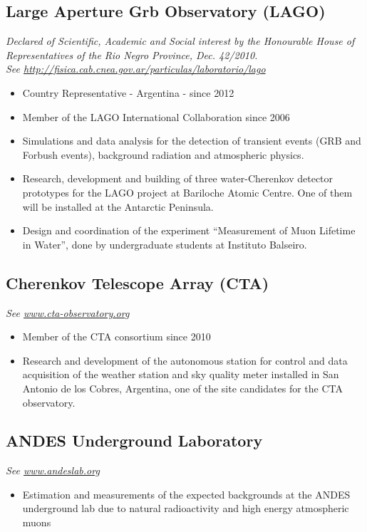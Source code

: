 \subsection*{Large Aperture Grb Observatory (LAGO)}
{\emph{Declared of Scientific, Academic and Social interest by the Honourable
House of Representatives of the Rio Negro Province, Dec. 42/2010.}}\\
{\small{\textit{See
\href{http://fisica.cab.cnea.gov.ar/particulas/laboratorio/lago}
{http://fisica.cab.cnea.gov.ar/particulas/laboratorio/lago}}}}\\
\begin{itemize}
\item Country Representative - Argentina - since 2012
\item Member of the LAGO International Collaboration since 2006
\item Simulations and data analysis for the detection of transient events
(GRB and Forbush events), background radiation and atmospheric physics.
\item Research, development and building of three water-Cherenkov detector
prototypes for the LAGO project at Bariloche Atomic Centre. One of them will be
installed at the Antarctic Peninsula.
\item Design and coordination of the experiment ``Measurement of Muon Lifetime in
Water'', done by undergraduate students at Instituto Balseiro.
\end{itemize}

\subsection*{Cherenkov Telescope Array (CTA)}
{\small{\textit{See \href{http://www.cta-observatory.org}{www.cta-observatory.org}}}}
\begin{itemize}
\item Member of the CTA consortium since 2010
\item Research and development of the autonomous station for control and data
acquisition of the weather station and sky quality meter installed in San
Antonio de los Cobres, Argentina, one of the site candidates for the CTA
observatory.
\end{itemize}

\subsection*{ANDES Underground Laboratory}
{\small{\textit{See \href{http://www.andeslab.org}{www.andeslab.org}}}}
\begin{itemize}
\item Estimation and measurements of the expected backgrounds at the ANDES
underground lab due to natural radioactivity and high energy atmospheric muons
\end{itemize}

